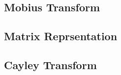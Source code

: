 \documentclass[a4paper, 10pt ]{article} %
\theoremstyle{definition}
\theoremstyle{plain}
\begin{document}

\subsection{Mobius Transform}
\subsection{Matrix Reprsentation}
\subsection{Cayley Transform}
\end{document}
